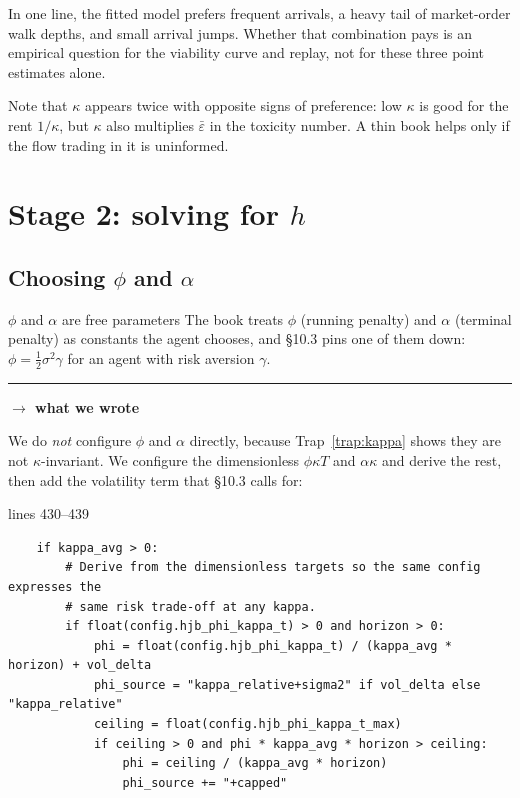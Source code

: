 \documentclass[11pt,a4paper]{article}
\newcommand{\wecode}{\par\vspace{4pt}\noindent
  \textcolor{NavyLink}{\rule{\linewidth}{0.4pt}}\par\vspace{3pt}
  \noindent\textbf{\textcolor{NavyLink}{$\rightarrow$ what we wrote}}\par\vspace{2pt}}
\newcommand{\epsb}{\bar{\varepsilon}}
\newcommand{\snip}[3]{%
  \par\addvspace{6pt}\noindent
  {\footnotesize\color{NavyLink}\texttt{\detokenize{#1}}\quad lines #2--#3}%
  \par\nobreak\vspace{1pt}}
\begin{document}
\noindent In one line, the fitted model prefers frequent arrivals, a heavy tail of
market-order walk depths, and small arrival jumps. Whether that combination pays
is an empirical question for the viability curve and replay, not for these three
point estimates alone.

Note that $\kappa$ appears twice with opposite signs of preference: low $\kappa$
is good for the rent $1/\kappa$, but $\kappa$ also multiplies $\epsb$ in the
toxicity number. A thin book helps only if the flow trading in it is uninformed.

\section{Stage 2: solving for \texorpdfstring{$h$}{h}}
\label{sec:solving}

\subsection{Choosing \texorpdfstring{$\phi$ and $\alpha$}{phi and alpha}}
\label{sec:phicode}

\begin{booktocode}{$\phi$ and $\alpha$ are free parameters}
The book treats $\phi$ (running penalty) and $\alpha$ (terminal penalty) as
constants the agent chooses, and \S10.3 pins one of them down:
$\phi = \tfrac12\sigma^{2}\gamma$ for an agent with risk aversion $\gamma$.
\wecode
We do \emph{not} configure $\phi$ and $\alpha$ directly, because
Trap~\ref{trap:kappa} shows they are not $\kappa$-invariant. We configure the
dimensionless $\phi\kappa T$ and $\alpha\kappa$ and derive the rest, then add the
volatility term that \S10.3 calls for:
\end{booktocode}

\snip{scripts/mm_core.py}{430}{439}
\begin{lstlisting}
    if kappa_avg > 0:
        # Derive from the dimensionless targets so the same config expresses the
        # same risk trade-off at any kappa.
        if float(config.hjb_phi_kappa_t) > 0 and horizon > 0:
            phi = float(config.hjb_phi_kappa_t) / (kappa_avg * horizon) + vol_delta
            phi_source = "kappa_relative+sigma2" if vol_delta else "kappa_relative"
            ceiling = float(config.hjb_phi_kappa_t_max)
            if ceiling > 0 and phi * kappa_avg * horizon > ceiling:
                phi = ceiling / (kappa_avg * horizon)
                phi_source += "+capped"
\end{lstlisting}
\end{document}

